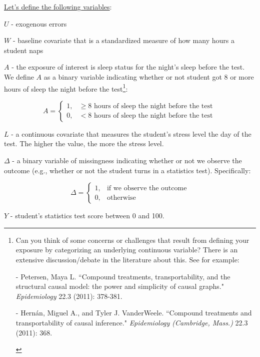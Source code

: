 \documentclass[answers]{exam}
\newenvironment{packed_item}{
\begin{itemize}
 \setlength{\itemsep}{0pt}
  \setlength{\parskip}{0pt}
  \setlength{\parsep}{0pt}
}{\end{itemize}}
\begin{document}
\underline{Let's define the following variables}: 
\begin{packed_item}
\item[] $U$ - exogenous errors
\item[] $W$ - baseline covariate that is a standardized measure of how many hours a student naps
\item[] $A$ - the exposure of interest is sleep status for the night's sleep before the test. We define $A$ as a binary variable indicating whether or not student got 8 or more hours of sleep the night before the test\footnote{Can you think of some concerns or challenges that result from defining your exposure by categorizing an underlying continuous variable? There is an extensive discussion/debate in the literature about this. See for example:
\begin{packed_item}
\item[-]Petersen, Maya L. ``Compound treatments, transportability, and the structural causal model: the power and simplicity of causal graphs." \textit{Epidemiology} 22.3 (2011): 378-381. 
\item[-] Hernán, Miguel A., and Tyler J. VanderWeele. ``Compound treatments and transportability of causal inference." \textit{Epidemiology (Cambridge, Mass.)} 22.3 (2011): 368.
\end{packed_item}
}:

  \begin{equation*}
    A=
    \begin{cases}
      1, & \geq 8 \text{ hours of sleep the night before the test}\ \\
      0, & < 8 \text{ hours of sleep the night before the test}
    \end{cases}
  \end{equation*}


  
\item[] $L$ - a continuous covariate that measures the student's stress level the day of the test. The higher the value, the more the stress level.
\item[] $\Delta$ - a binary variable of missingness indicating whether or not we observe the outcome (e.g., whether or not the student turns in a statistics test). Specifically:

  \begin{equation*}
    \Delta=
    \begin{cases}
      1, & \text{if we observe the outcome} \\
      0, & \text{otherwise}
    \end{cases}
  \end{equation*}


\item[] $Y$ - student's statistics test score between 0 and 100.
\end{packed_item}
\end{document}
